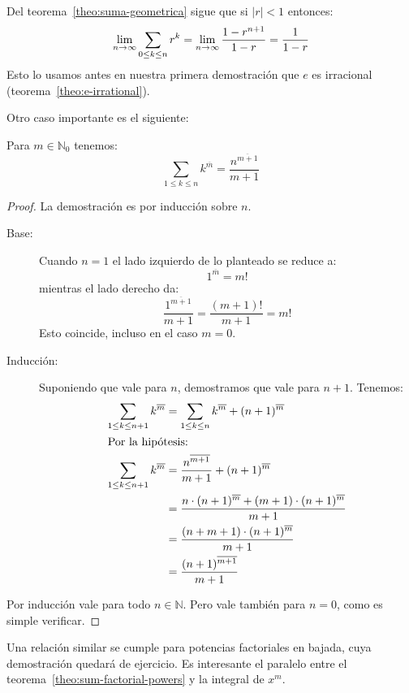   Del teorema~\ref{theo:suma-geometrica}
  sigue que si \(\lvert r \rvert < 1\) entonces:
  \begin{equation}
    \index{suma!geometrica@geométrica!infinita|textbfhy}
    \label{eq:limite-suma-geometrica}
    \lim_{n \rightarrow \infty} \sum_{0 \le k \le n} r^k
      = \lim_{n \rightarrow \infty} \frac{1 - r^{n + 1}}{1 - r}
      = \frac{1}{1 - r}
  \end{equation}
  Esto lo usamos antes
  en nuestra primera demostración que \(e\) es irracional
  (teorema~\ref{theo:e-irrational}).

  Otro caso importante es el siguiente:
  \begin{theorem}
    \label{theo:sum-factorial-powers}
    Para \(m \in \mathbb{N}_0\) tenemos:
    \begin{equation*}
      \sum_{1 \le k \le n} k^{\overline{m}}
	= \frac{n^{\overline{m + 1}}}{m + 1}
    \end{equation*}
  \end{theorem}
  \begin{proof}
    La demostración es por inducción sobre \(n\).
    \begin{description}
    \item[Base:]
      Cuando \(n = 1\)
      el lado izquierdo de lo planteado se reduce a:
      \begin{equation*}
	1^{\overline{m}}
	 = m!
      \end{equation*}
      mientras el lado derecho da:
      \begin{equation*}
	\frac{1^{\overline{m + 1}}}{m + 1}
	  = \frac{(m + 1)!}{m + 1}
	  = m!
      \end{equation*}
      Esto coincide,
      incluso en el caso \(m = 0\).
    \item[Inducción:]
      Suponiendo que vale para \(n\),
      demostramos que vale para \(n + 1\).
      Tenemos:
      \begin{align*}
	\sum_{1 \le k \le n + 1} k^{\overline{m}}
	  &= \sum_{1 \le k \le n}
	       k^{\overline{m}} + (n + 1)^{\overline{m}} \\
      \intertext{Por la hipótesis:}
	\sum_{1 \le k \le n + 1} k^{\overline{m}}
	  &= \frac{n^{\overline{m + 1}}}{m + 1}
	       + (n + 1)^{\overline{m}} \\
	  &= \frac{n \cdot (n + 1)^{\overline{m}}
		     + (m + 1) \cdot (n + 1)^{\overline{m}}}
		  {m + 1} \\
	  &= \frac{(n + m + 1) \cdot (n + 1)^{\overline{m}}}
		  {m + 1} \\
	  &= \frac{(n + 1)^{\overline{m + 1}}}{m + 1}
      \end{align*}
    \end{description}
    Por inducción vale para todo \(n \in \mathbb{N}\).
    Pero vale también para \(n = 0\),
    como es simple verificar.
  \end{proof}
  Una relación similar
  se cumple para potencias factoriales en bajada,
  cuya demostración quedará de ejercicio.
  Es interesante el paralelo
  entre el teorema~\ref{theo:sum-factorial-powers}
  y la integral de \(x^m\).

